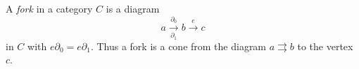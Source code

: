 A \emph{fork} in a category $C$ is a diagram
$$a \xrightarrow[\partial_1]{\partial_0} b \xrightarrow{e} c$$
in $C$ with $e \partial_0 = e \partial_1$.
Thus a fork is a cone from the diagram $a \rightrightarrows b$ to the vertex $c$.
